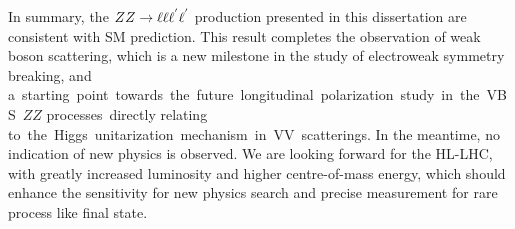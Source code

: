 In summary, the $ZZ \rightarrow \ell\ell\ell^{'}\ell^{'}$ production presented in this dissertation are consistent with SM prediction.
This result completes the observation of weak boson scattering, which is a new milestone in the study of electroweak symmetry breaking,
and a starting point towards the future longitudinal polarization study in the VBS $ZZ$ processes directly relating to the Higgs unitarization mechanism in VV scatterings.
In the meantime, no indication of new physics is observed.
We are looking forward for the HL-LHC, with greatly increased luminosity and higher centre-of-mass energy, 
which should enhance the sensitivity for new physics search and precise measurement for rare process like \llll final state.
